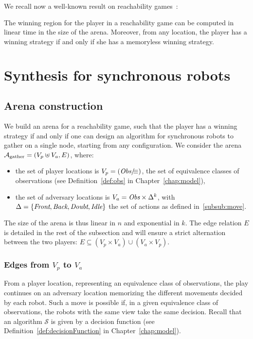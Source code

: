 We recall now a well-known result on reachability games~\cite{MartinBorelDeterminacy}: 
\begin{theorem} \label{th: memoryless}The winning region for the player in a reachability
game can be computed in linear time in the size of the arena. Moreover, from any location, the player
has a winning strategy if and only if she has a memoryless winning strategy.
\end{theorem}%







\section {Synthesis for synchronous robots}
		\subsection {Arena construction}
		\label{sub:synth}
We build an arena for a reachability game, such that the player has a winning strategy 
if and only if one can design an algorithm for synchronous robots to gather on a single node, 
starting from any configuration. We consider the arena $\mathcal{A}_{\textrm{gather}}=(V_p\uplus V_a, E)$, 
where:  
\begin{itemize}
\item the set of player locations is $V_p= (\textit{Obs}/\!\!\!\equiv)$, the set of equivalence classes of observations (see Definition~\ref{def:obs} in Chapter~\ref{chap:model}), 
\item the set of adversary locations 
is $V_a= \textit{Obs} \times \Delta^k$, with $\Delta=\{ \textit{Front}, \textit{Back}, \textit{Doubt}, \textit{Idle} \}$  the set of actions as defined in~\ref{subsub:move}. 
\end{itemize}
The size of the arena is thus linear in $n$ and exponential in $k$.
The edge relation $E$ is detailed in the rest of the subsection and will ensure a strict alternation between the two players:  $E\subseteq (V_p\times V_a) \cup (V_a\times V_p)$.

\subsubsection{Edges from $V_p$ to $V_a$}
From a player location, representing an equivalence class of observations, 
the play continues on an adversary location memorizing the different movements
decided by each robot. Such a move is possible if, in a given equivalence class
of observations, the robots with the same view take the same decision. Recall that an algorithm 
$\mathcal{S}$ is given by a decision function (see Definition~\ref{def:decisionFunction} in Chapter~\ref{chap:model}).
\bigskip


